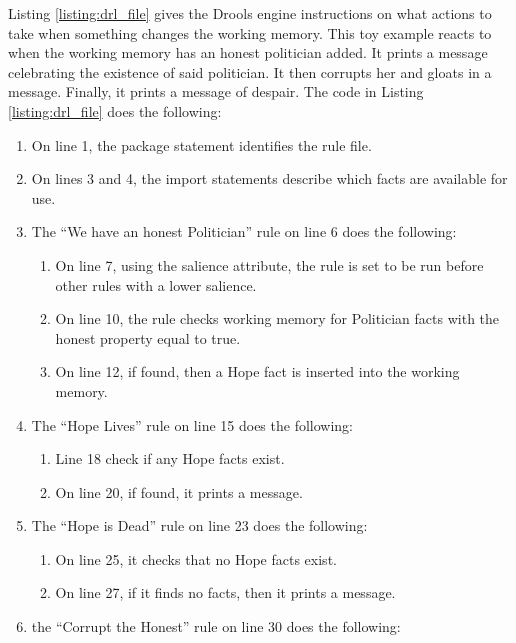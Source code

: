 Listing \ref{listing:drl_file} gives the Drools engine instructions on what actions to take when something changes the working memory.
This toy example reacts to when the working memory has an honest politician added. 
It prints a message celebrating the existence of said politician.
It then corrupts her and gloats in a message.
Finally, it prints a message of despair.
The code in Listing \ref{listing:drl_file} does the following: 
\begin{enumerate}[topsep=2pt,itemsep=2pt,partopsep=2pt, parsep=2pt]
    \item On line 1, the package statement identifies the rule file.
    \item On lines 3 and 4, the import statements describe which facts are available for use.
    \item The ``We have an honest Politician'' rule on line 6 does the following:
    \begin{enumerate}[topsep=2pt,itemsep=2pt,partopsep=2pt, parsep=2pt]
        \item On line 7, using the salience attribute, the rule is set to be run before other rules with a lower salience.
        \item On line 10, the rule checks working memory for Politician facts with the honest property equal to true.
        \item On line 12, if found, then a Hope fact is inserted into the working memory.
    \end{enumerate}
    \item The ``Hope Lives'' rule on line 15 does the following:
    \begin{enumerate}[topsep=2pt,itemsep=2pt,partopsep=2pt, parsep=2pt]
        \item Line 18 check if any Hope facts exist.
        \item On line 20, if found, it prints a message.
    \end{enumerate}
    \item The ``Hope is Dead'' rule on line 23 does the following:
    \begin{enumerate}[topsep=2pt,itemsep=2pt,partopsep=2pt, parsep=2pt]
        \item On line 25, it checks that no Hope facts exist.
        \item On line 27, if it finds no facts, then it prints a message.  
    \end{enumerate}
    \item the ``Corrupt the Honest'' rule on line 30 does the following:

\end{enumerate}

